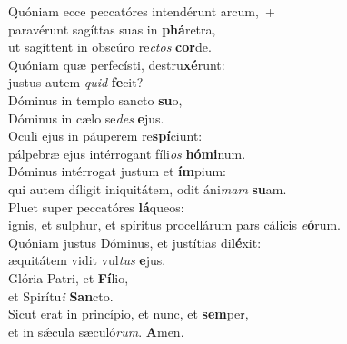 \evenverse Quóniam ecce peccatóres intendérunt arcum,~+\\\evenverse  paravérunt sagíttas suas in \textbf{phá}retra,~\*\\
\evenverse ut sagíttent in obscúro re\textit{ctos} \textbf{cor}de.\\
\oddverse Quóniam quæ perfecísti, destru\textbf{xé}runt:~\*\\
\oddverse justus autem \textit{quid} \textbf{fe}cit?\\
\evenverse Dóminus in templo sancto \textbf{su}o,~\*\\
\evenverse Dóminus in cælo se\textit{des} \textbf{e}jus.\\
\oddverse Oculi ejus in páuperem re\textbf{spí}ciunt:~\*\\
\oddverse pálpebræ ejus intérrogant fíli\textit{os} \textbf{hó}\textbf{mi}num.\\
\evenverse Dóminus intérrogat justum et \textbf{ím}pium:~\*\\
\evenverse qui autem díligit iniquitátem, odit áni\textit{mam} \textbf{su}am.\\
\oddverse Pluet super peccatóres \textbf{lá}queos:~\*\\
\oddverse ignis, et sulphur, et spíritus procellárum pars cálicis \textit{e}\textbf{ó}rum.\\
\evenverse Quóniam justus Dóminus, et justítias di\textbf{lé}xit:~\*\\
\evenverse æquitátem vidit vul\textit{tus} \textbf{e}jus.\\
\oddverse Glória Patri, et \textbf{Fí}lio,~\*\\
\oddverse et Spirítu\textit{i} \textbf{San}cto.\\
\evenverse Sicut erat in princípio, et nunc, et \textbf{sem}per,~\*\\
\evenverse et in sǽcula sæculó\textit{rum}. \textbf{A}men.\\
